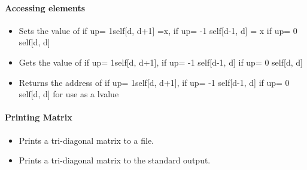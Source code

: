 \paragraph{Accessing elements}
\begin{itemize}
\item {}
  \sshortdescribe Sets the value of if up= 1self[d, d+1] =x, if up= -1 self[d-1, d] = x if up= 0 self[d, d]  
\item {}
  \sshortdescribe Gets the value of if up= 1self[d, d+1], if up= -1 self[d-1, d] if up= 0 self[d, d]  
\item {}
  \sshortdescribe Returns the address of if up= 1self[d, d+1], if up= -1 self[d-1, d] if up= 0 self[d, d] for use as a lvalue  
\end{itemize}

\paragraph{Printing Matrix}
\begin{itemize}
\item {}
  \sshortdescribe Prints a tri-diagonal matrix to a file.  
\item {}
  \sshortdescribe Prints a tri-diagonal matrix to the standard output.  
\end{itemize}

